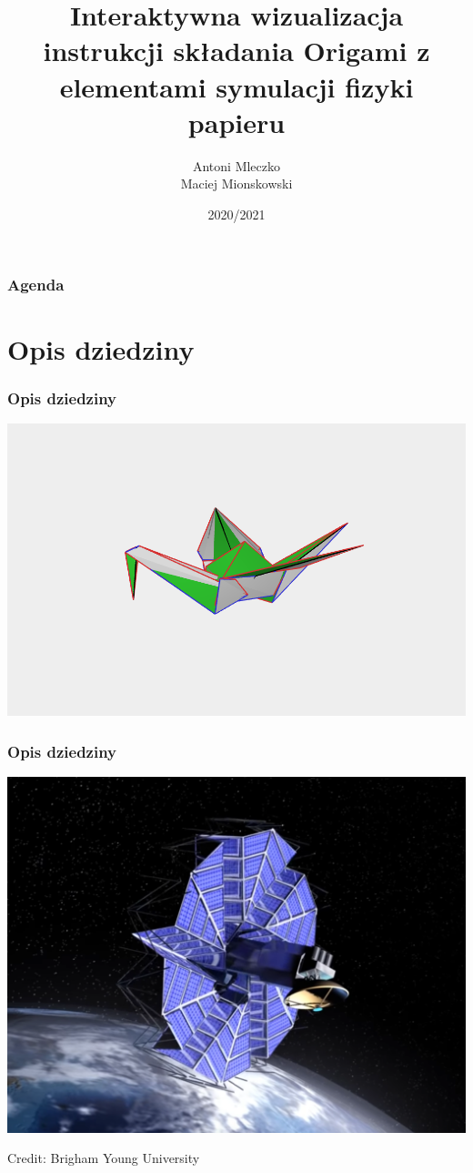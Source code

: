 \documentclass{beamer}
\author[Antoni M. \\ Maciej M.]{
	Antoni Mleczko \\
	Maciej Mionskowski
}
\title[Origami]{Interaktywna wizualizacja instrukcji składania Origami z elementami symulacji fizyki papieru}
\date{2020/2021}
\institute{Wydział Informatyki, Elektroniki i Telekomunikacji}
\begin{document}
\begin{frame}
  \titlepage
\end{frame}

\begin{frame}
  \frametitle{Agenda}
  \tableofcontents
\end{frame}

\section{Opis dziedziny}
\begin{frame}
  \frametitle{Opis dziedziny}
  \includegraphics[width=\linewidth]{assets/pres-crane.png}
\end{frame}
\begin{frame}
  \frametitle{Opis dziedziny}
  \centering
	\includegraphics[width=0.9\linewidth]{assets/solar-deployment.png} \\
	\begin{flushright}
		\tiny{Credit: Brigham Young University}
	\end{flushright}
\end{frame}
\end{document}
